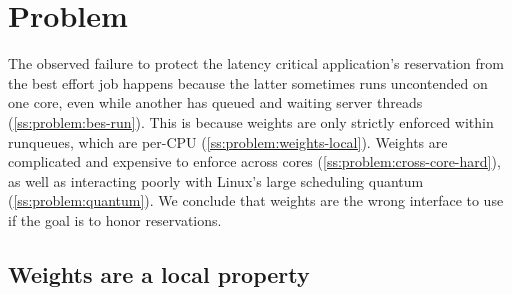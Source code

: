 \section{Problem}\label{s:problem}

The observed failure to protect the latency critical application's reservation
from the best effort job happens because the latter sometimes runs uncontended
on one core, even while another has queued and waiting server threads
(\autoref{ss:problem:bes-run}). This is because weights are only strictly
enforced within runqueues, which are per-CPU
(\autoref{ss:problem:weights-local}). Weights are complicated and expensive to
enforce across cores (\autoref{ss:problem:cross-core-hard}), as well as
interacting poorly with Linux's large scheduling quantum
(\autoref{ss:problem:quantum}). We conclude that weights are the wrong interface
to use if the goal is to honor reservations.

\subsection{Weights are a local property}\label{ss:problem:bes-run}

